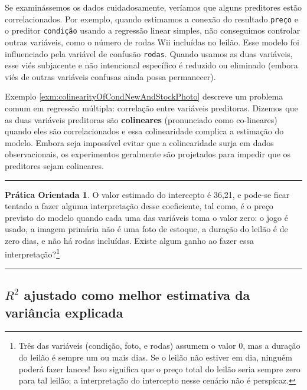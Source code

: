 \documentclass[
]{book}
\theoremstyle{definition}
\theoremstyle{definition}
\theoremstyle{definition}
\newtheorem{exercise}{Prática Orientada}[chapter]
\theoremstyle{definition}
\theoremstyle{remark}
\begin{document}
Se examinássemos os dados cuidadosamente, veríamos que alguns preditores estão correlacionados. Por exemplo, quando estimamos a conexão do resultado \texttt{preço} e o preditor \texttt{condição} usando a regressão linear simples, não conseguimos controlar outras variáveis, como o número de rodas Wii incluídas no leilão. Esse modelo foi influenciado pela variável de confusão \texttt{rodas}. Quando usamos as duas variáveis, esse viés subjacente e não intencional específico é reduzido ou eliminado (embora viés de outras variáveis confusas ainda possa permanecer).

Exemplo \ref{exm:colinearityOfCondNewAndStockPhoto} descreve um problema comum em regressão múltipla: correlação entre variáveis preditoras. Dizemos que as duas variáveis preditoras são \textbf{colineares} (pronunciado como co-lineares) quando eles são correlacionados e essa colinearidade complica a estimação do modelo. Embora seja impossível evitar que a colinearidade surja em dados observacionais, os experimentos geralmente são projetados para impedir que os preditores sejam colineares.

\begin{center}\rule{0.5\linewidth}{0.5pt}\end{center}

\begin{exercise}
\protect\hypertarget{exr:unnamed-chunk-288}{}{\label{exr:unnamed-chunk-288} }O valor estimado do intercepto é 36,21, e pode-se ficar tentado a fazer alguma interpretação desse coeficiente, tal como, é o preço previsto do modelo quando cada uma das variáveis toma o valor zero: o jogo é usado, a imagem primária não é uma foto de estoque, a duração do leilão é de zero dias, e não há rodas incluídas. Existe algum ganho ao fazer essa interpretação?\footnote{Três das variáveis (condição, foto, e rodas) assumem o valor 0, mas a duração do leilão é sempre um ou mais dias. Se o leilão não estiver em dia, ninguém poderá fazer lances! Isso significa que o preço total do leilão seria sempre zero para tal leilão; a interpretação do intercepto nesse cenário não é perspicaz.}
\end{exercise}

\begin{center}\rule{0.5\linewidth}{0.5pt}\end{center}

\hypertarget{R2adj}{%
\subsection{\texorpdfstring{\(R^2\) ajustado como melhor estimativa da variância explicada}{R\^{}2 ajustado como melhor estimativa da variância explicada}}\label{R2adj}}
\end{document}
